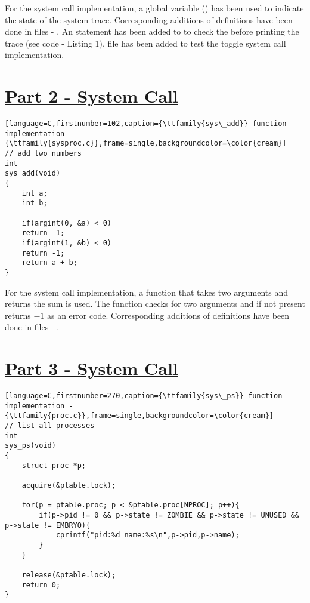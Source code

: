 \documentclass[12pt]{article}
\begin{document}
\vspace{5mm}
\begin{addmargin}[0.1in]{0in}
    For the {} system call implementation, a global variable ({}) has been used to indicate the state of the system trace. Corresponding additions of definitions have been done in files - {}. An {} statement has been added to {} to check the {} before printing the trace (see code - Listing 1). {} file has been added to test the toggle system call implementation.
\end{addmargin}

\section*{\underline{Part 2 - {} System Call}}
\begin{addmargin}[0.7in]{0in}
\begin{lstlisting}[language=C,firstnumber=102,caption={\ttfamily{sys\_add}} function implementation - {\ttfamily{sysproc.c}},frame=single,backgroundcolor=\color{cream}]
// add two numbers
int
sys_add(void)
{
    int a;
    int b;

    if(argint(0, &a) < 0)
    return -1;
    if(argint(1, &b) < 0)
    return -1;
    return a + b;
}
\end{lstlisting}
\end{addmargin}

\begin{addmargin}[0.1in]{0in}
    For the {} system call implementation, a function that takes two arguments and returns the sum is used. The function checks for two arguments and if not present returns $-1$ as an error code. Corresponding additions of definitions have been done in files - {}.
\end{addmargin}

\section*{\underline{Part 3 - {} System Call}}
\begin{addmargin}[0.7in]{0in}
\begin{lstlisting}[language=C,firstnumber=270,caption={\ttfamily{sys\_ps}} function implementation - {\ttfamily{proc.c}},frame=single,backgroundcolor=\color{cream}]
// list all processes
int
sys_ps(void)
{
    struct proc *p;
    
    acquire(&ptable.lock);

    for(p = ptable.proc; p < &ptable.proc[NPROC]; p++){
        if(p->pid != 0 && p->state != ZOMBIE && p->state != UNUSED && p->state != EMBRYO){
            cprintf("pid:%d name:%s\n",p->pid,p->name);
        }
    }

    release(&ptable.lock);
    return 0;
}
\end{lstlisting}
\end{addmargin}
\end{document}
